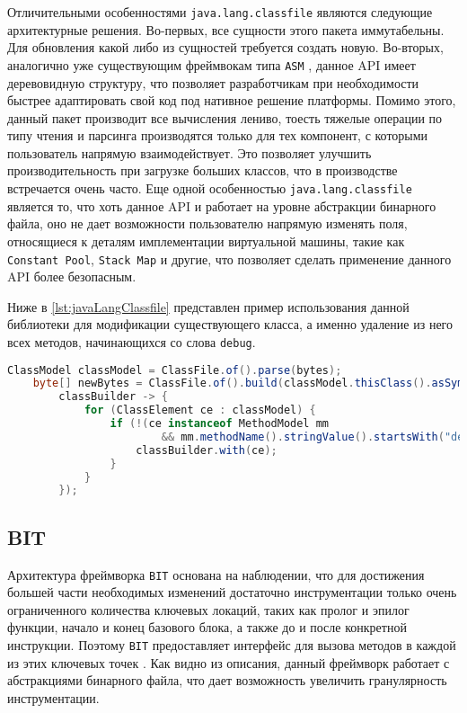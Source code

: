 Отличительными особенностями \texttt{java.lang.classfile} являются следующие архитектурные решения. Во-первых, все сущности этого пакета иммутабельны. Для обновления какой либо из сущностей требуется создать новую. Во-вторых, аналогично уже существующим фреймвокам типа \texttt{ASM} \cite{asm}, данное API имеет деревовидную структуру, что позволяет разработчикам при необходимости быстрее адаптировать свой код под нативное решение платформы. Помимо этого, данный пакет производит все вычисления лениво, тоесть тяжелые операции по типу чтения и парсинга производятся только для тех компонент, с которыми пользователь напрямую взаимодействует. Это позволяет улучшить производительность при загрузке больших классов, что в производстве встречается очень часто. Еще одной особенностью \texttt{java.lang.classfile} является то, что хоть данное API и работает на уровне абстракции бинарного файла, оно не дает возможности пользователю напрямую изменять поля, относящиеся к деталям имплементации виртуальной машины, такие как \texttt{Constant~Pool}, \texttt{Stack~Map} и другие, что позволяет сделать применение данного API более безопасным.

Ниже в \autoref{lst:javaLangClassfile} представлен пример использования данной библиотеки для модификации существующего класса, а именно удаление из него всех методов, начинающихся со слова \texttt{debug}.

\begin{lstlisting}[language=Java, caption=Удаление методов отладки из класса при помощи библиотеки \texttt{java.lang.classfile}, label=lst:javaLangClassfile]
    ClassModel classModel = ClassFile.of().parse(bytes);
    byte[] newBytes = ClassFile.of().build(classModel.thisClass().asSymbol(),
        classBuilder -> {
            for (ClassElement ce : classModel) {
                if (!(ce instanceof MethodModel mm
                        && mm.methodName().stringValue().startsWith("debug"))) {
                    classBuilder.with(ce);
                }
            }
        });
\end{lstlisting}

\subsection{BIT}

Архитектура фреймворка \texttt{BIT} основана на наблюдении, что для достижения большей части необходимых изменений достаточно инструментации только очень ограниченного количества ключевых локаций, таких как пролог и эпилог функции, начало и конец базового блока, а также до и после конкретной инструкции. Поэтому \texttt{BIT} предоставляет интерфейс для вызова методов в каждой из этих ключевых точек \cite{bit}. Как видно из описания, данный фреймворк работает с абстракциями бинарного файла, что дает возможность увеличить гранулярность инструментации.

